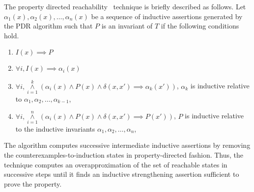 %
The property directed reachability~\cite{fmcad07} technique is briefly 
described as follows. 
%
Let $\alpha_1(x), \alpha_2(x),\ldots,\alpha_n(x)$ be a sequence of 
inductive assertions generated by the PDR algorithm such that 
$P$ is an invariant of $T$ if the following conditions hold.
\begin{enumerate}
 \item $I(x) \implies P$
 \item $\forall i, I(x) \implies \alpha_i(x)$
 \item $\forall i, {\overset{k}{\underset{i=1}{\wedge}}} 
	 (\alpha_i(x) \wedge P(x) \wedge \delta(x,x') \implies \alpha_k(x'))$,
 $\alpha_k$ is inductive relative to $\alpha_1, \alpha_2,\ldots,\alpha_{k-1}$,
 \item $\forall i, {\overset{n}{\underset{i=1}{\wedge}}} 
	(\alpha_i(x) \wedge P(x) \wedge \delta(x,x') \implies P(x'))$, 
 $P$ is inductive relative to the inductive invariants $\alpha_1,\alpha_2,\ldots,\alpha_n$, 
\end{enumerate}
%
The algorithm computes successive intermediate 
inductive assertions by removing the counterexamples-to-induction states in 
property-directed fashion.  Thus, the technique computes an overapproximation 
of the set of reachable states in successive steps until it finds an 
inductive strengthening assertion sufficient to prove the property. 
%
